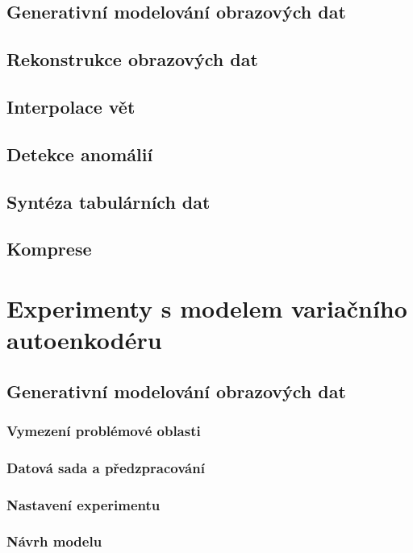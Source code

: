 \documentclass[11pt,a4paper]{report}
\begin{document}
\section{Generativní modelování obrazových dat}
\section{Rekonstrukce obrazových dat}
\section{Interpolace vět}
\section{Detekce anomálií}
\section{Syntéza tabulárních dat}
\section{Komprese}


\chapter{Experimenty s modelem variačního autoenkodéru}
\section{Generativní modelování obrazových dat}
\subsection{Vymezení problémové oblasti}
\subsection{Datová sada a předzpracování}
\subsection{Nastavení experimentu}
\subsection{Návrh modelu}
\end{document}
